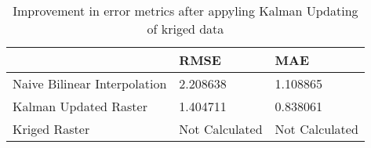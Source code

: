 \begin{table}
\caption{Improvement in error metrics after appyling Kalman Updating of kriged data}
\label{tab:Florida_keys_lidar_error}
\begin{tabular}{lll}
\toprule
 & RMSE & MAE \\
\midrule
Naive Bilinear Interpolation & 2.208638 & 1.108865 \\
Kalman Updated Raster & 1.404711 & 0.838061 \\
Kriged Raster & Not Calculated & Not Calculated \\
\bottomrule
\end{tabular}
\end{table}
